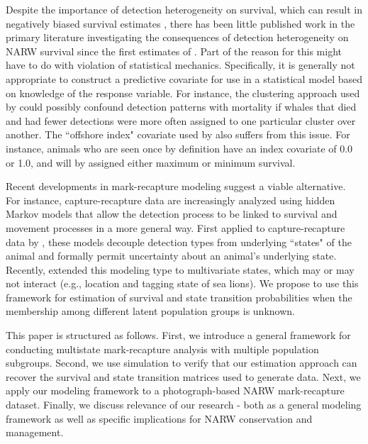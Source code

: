 \documentclass[times,mee,doublespace,]{besauth2}
\begin{document}
Despite the importance of detection heterogeneity on survival, which can result in negatively biased survival estimates \citep{AbadiEtAl2013}, there has been little published work in the primary literature investigating the consequences of detection heterogeneity on NARW survival since the first estimates of \citet{CaswellEtAl1999}.  Part of the reason for this might have to do with violation of statistical mechanics.  Specifically, it is generally not appropriate to construct a predictive covariate for use in a statistical model based on knowledge of the response variable.  For instance, the clustering approach used by \citet{WadeClaphamUnpublished} could possibly confound detection patterns with mortality if whales that died and had fewer detections were more often assigned to one particular cluster over another.  The ``offshore index" covariate used by \citet{CaswellEtAl1999} also suffers from this issue.  For instance, animals who are seen once by definition have an index covariate of 0.0 or 1.0, and will by assigned either maximum or minimum survival.

Recent developments in mark-recapture modeling suggest a viable alternative.  For instance, capture-recapture data are increasingly analyzed using hidden Markov models \citep[HMMs][]{ZucchiniMacDonald2009} that allow the detection process to be linked to survival and movement processes in a more general way.  First applied to capture-recapture data by \citet{Pradel2005}, these models decouple detection types from underlying ``states" of the animal and formally permit uncertainty about an animal's underlying state.  Recently, \citet{JohnsonEtAl2016} extended this modeling type to multivariate states, which may or may not interact (e.g., location and tagging state of sea lions).  We propose to use this framework for estimation of survival and state transition probabilities when the membership among different latent population groups is unknown.

This paper is structured as follows.  First, we introduce a general framework for conducting multistate mark-recapture analysis with multiple population subgroups.  Second, we use simulation to verify that our estimation approach can recover the survival and state transition matrices used to generate data.  Next, we apply our modeling framework to a photograph-based NARW mark-recapture dataset.  Finally, we discuss relevance of our research - both as a general modeling framework as well as specific implications for NARW conservation and management.
\end{document}
